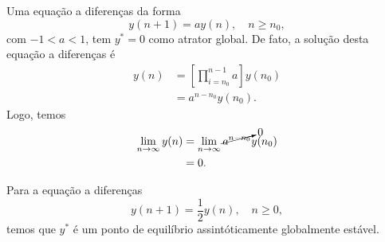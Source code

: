 Uma equação a diferenças da forma
  \begin{equation}
    y(n+1) = ay(n),\quad n\geq n_0,
  \end{equation}
  com $-1<a<1$, tem $y^*=0$ como atrator global. De fato, a solução desta equação a diferenças é
  \begin{align}
    y(n) &= \left[\prod_{i=n_0}^{n-1}a\right]y(n_0) \\
         &= a^{n-n_0}y(n_0).
  \end{align}
  Logo, temos
  \begin{align}
    \lim_{n\to\infty} y(n) &= \lim_{n\to\infty} \cancelto{0}{a^{n-n_0}}y(n_0)\\
                           &= 0.
  \end{align}

\begin{ex}
  Para a equação a diferenças
  \begin{equation}
    y(n+1) = \frac{1}{2}y(n),\quad n\geq 0,
  \end{equation}
  temos que $y^*$ é um ponto de equilíbrio assintóticamente globalmente estável.
\end{ex}

